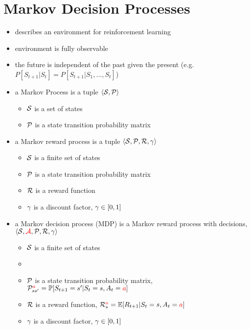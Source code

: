 \documentclass[../main.tex]{subfiles}
\begin{document}
\section{Markov Decision Processes}
\begin{itemize}
  \item describes an environment for reinforcement learning
  \item environment is fully observable
  \item the future is independent of the past given the present (e.g. $P[S_{t+1}|S_{t}] = P[S_{t+1}|S_{1}, ..., S_{t}]$)
  \item a Markov Process is a tuple $\langle \mathcal{S}, \mathcal{P} \rangle$
  \begin{itemize}
    \item $\mathcal{S}$ is a set of states
    \item $\mathcal{P}$ is a state transition probability matrix
  \end{itemize}

  \item a Markov reward process is a tuple $\langle \mathcal{S}, \mathcal{P}, \mathcal{R}, \gamma \rangle$
  \begin{itemize}
    \item $\mathcal{S}$ is a finite set of states
    \item $\mathcal{P}$ is a state transition probability matrix
    \item $\mathcal{R}$ is a reward function
    \item $\gamma$ is a discount factor, $\gamma \in [0, 1]$
  \end{itemize}

  \item a Markov decision process (MDP) is a Markov reward process with decisions, $\langle \mathcal{S}, \textcolor{red}{\mathcal{A}}, \mathcal{P}, \mathcal{R}, \gamma \rangle$
  \begin{itemize}
    \item $\mathcal{S}$ is a finite set of states
    \item {}
    \item $\mathcal{P}$ is a state transition probability matrix, $\mathcal{P}_{ss'}^{\textcolor{red}{a}} = \mathbb{P}[S_{t+1} = s' | S_{t} = s, A_{t} = \textcolor{red}{a}]$
    \item $\mathcal{R}$ is a reward function, $\mathcal{R}_{s}^{\textcolor{red}{a}} = \mathbb{E}[R_{t+1} | S_{t} = s, A_{t} = \textcolor{red}{a}]$
    \item $\gamma$ is a discount factor, $\gamma \in [0, 1]$
  \end{itemize}


\end{itemize}
\end{document}
